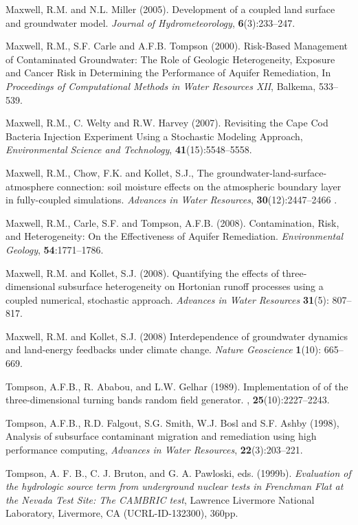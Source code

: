 \begin{thebibliography}{99}
Maxwell, R.M. and N.L. Miller (2005). Development of a coupled land surface and groundwater model.  {\em Journal of Hydrometeorology}, {\bf 6}(3):233--247.

Maxwell, R.M., S.F. Carle and A.F.B. Tompson (2000). Risk-Based Management of Contaminated Groundwater: The Role of Geologic Heterogeneity, Exposure and Cancer Risk in Determining the Performance of Aquifer Remediation, In {\em Proceedings of Computational Methods in Water Resources XII}, Balkema, 533--539.

 Maxwell, R.M., C. Welty and R.W. Harvey (2007). Revisiting the Cape Cod Bacteria Injection Experiment Using a Stochastic Modeling Approach, {\em Environmental Science and Technology}, { \bf 41}(15):5548--5558.

Maxwell, R.M., Chow, F.K. and Kollet, S.J., The groundwater-land-surface-atmosphere connection: soil moisture effects on the atmospheric boundary layer in fully-coupled simulations. {\em Advances in Water Resources}, {\bf 30}(12):2447--2466 .

Maxwell, R.M., Carle, S.F. and Tompson, A.F.B. (2008).
Contamination, Risk, and Heterogeneity: On the Effectiveness of Aquifer Remediation. {\em Environmental Geology}, {\bf 54}:1771--1786.

Maxwell, R.M. and Kollet, S.J. (2008). Quantifying the effects of three-dimensional subsurface heterogeneity on Hortonian runoff processes using a coupled numerical, stochastic approach. {\em Advances in Water Resources} {\bf 31}(5): 807--817. 

Maxwell, R.M. and Kollet, S.J. (2008) Interdependence of groundwater dynamics and land-energy feedbacks under climate change. {\em Nature Geoscience} {\bf 1}(10): 665--669.

Tompson, A.F.B., R. Ababou, and L.W. Gelhar (1989).
\newblock Implementation of of the three-dimensional turning bands random field
  generator.
, {\bf 25}(10):2227--2243.

  Tompson, A.F.B., R.D. Falgout, S.G. Smith, W.J. Bosl and
S.F. Ashby (1998), Analysis of subsurface contaminant migration and
remediation using high performance computing, {\em Advances in Water
Resources}, { \bf 22}(3):203--221.

Tompson, A. F. B., C. J. Bruton, and G. A. Pawloski, eds. (1999b). {\em Evaluation of the hydrologic source term from underground nuclear tests in Frenchman Flat at the Nevada Test Site: The CAMBRIC test}, Lawrence Livermore National Laboratory, Livermore, CA (UCRL-ID-132300), 360pp. 


\end{thebibliography}
